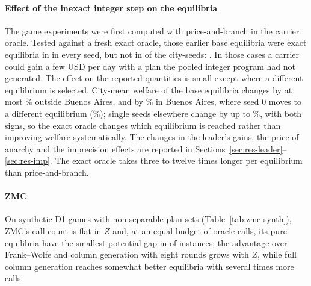 \documentclass[preprint,12pt]{elsarticle}
\theoremstyle{definition}
\theoremstyle{remark}
\begin{document}
\begin{table}[t]\centering\small
\caption{Branch-and-price with BRL pricing on the nine metro routing instances (seed 0, 22 customer zones, robust objective in driver-hours). Root LP: column-generation bound; P\&B plan: price-and-branch plan of the earlier pipeline; B\&P optimum and remaining gap; nodes and time on one core; difference of the optimum from the best of three heuristics under the robust objective, and from the SAA heuristic plan under the calibrated law. $^*$Moscow congestion imputed.}\label{tab:brl-metro}
\end{table}

\paragraph{Effect of the inexact integer step on the equilibria} The game experiments were first computed with price-and-branch in the carrier oracle. Tested against a fresh exact oracle, those earlier base equilibria were exact equilibria in \ExOldExactCities{} in every seed, but not in \ExOldBadN{} of the \ExOldN{} city-seeds: \ExOldBadList. In those cases a carrier could gain a few USD per day with a plan the pooled integer program had not generated. The effect on the reported quantities is small except where a different equilibrium is selected. City-mean welfare of the base equilibria changes by at most \ExEoneWMeanMaxNotBA\% outside Buenos Aires, and by \ExEoneWMeanBA\% in Buenos Aires, where seed 0 moves to a different equilibrium (\ExEoneWChangeBA\%); single seeds elsewhere change by up to \ExEoneWChangeMaxNotBA\%, with both signs, so the exact oracle changes which equilibrium is reached rather than improving welfare systematically. The changes in the leader's gains, the price of anarchy and the imprecision effects are reported in Sections~\ref{sec:res-leader}--\ref{sec:res-imp}. The exact oracle takes three to twelve times longer per equilibrium than price-and-branch.

\paragraph{ZMC} On synthetic D1 games with non-separable plan sets (Table~\ref{tab:zmc-synth}), ZMC's call count is flat in $Z$ and, at an equal budget of oracle calls, its pure equilibria have the smallest potential gap in \ZMCsynthWins{} of \ZMCsynthN{} instances; the advantage over Frank--Wolfe and column generation with eight rounds grows with $Z$, while full column generation reaches somewhat better equilibria with several times more calls.
\end{document}
